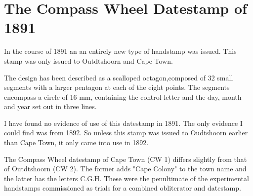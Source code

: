 \section{The Compass Wheel Datestamp of 1891}

In the course of 1891 an an entirely new type of handstamp was issued. 
This stamp was only issued to Outdtshoorn and Cape Town.


The design has been described as a scalloped octagon,composed of 
32 small segments with a larger pentagon at each of the eight points. 
The segments encompass a circle of 16 mm, containing the control 
letter and the day, month and year set out in three lines.

I have found no evidence of use of this datestamp in 1891. 
The only evidence I could find was from 1892. So unless this stamp was issued to 
Oudtshoorn earlier than Cape Town, it only came into use in 1892.
  	 


The Compass Wheel datestamp of Cape Town (CW 1) differs slightly from 
that of Outdtshoorn (CW 2). The former adds "Cape Colony" to 
the town name and the latter has the letters C.G.H. These were 
the penultimate of the experimental handstamps commissioned as 
trials for a combined obliterator and datestamp.

 

                 